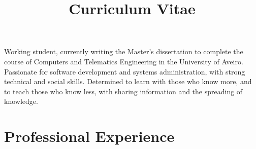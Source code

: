 \documentclass[11pt,a4paper,sans]{moderncv} %
\title{Curriculum Vitae}                               %
\begin{document}
\makecvtitle

\small{Working student, currently writing the Master's dissertation to
  complete the course of Computers and Telematics Engineering in the University
  of Aveiro. Passionate for software development and systems administration,
  with strong technical and social skills. Determined to learn with those who
  know more, and to teach those who know less, with sharing information and the
  spreading of knowledge.}

\section{Professional Experience}

\vspace{6pt}
\end{document}
